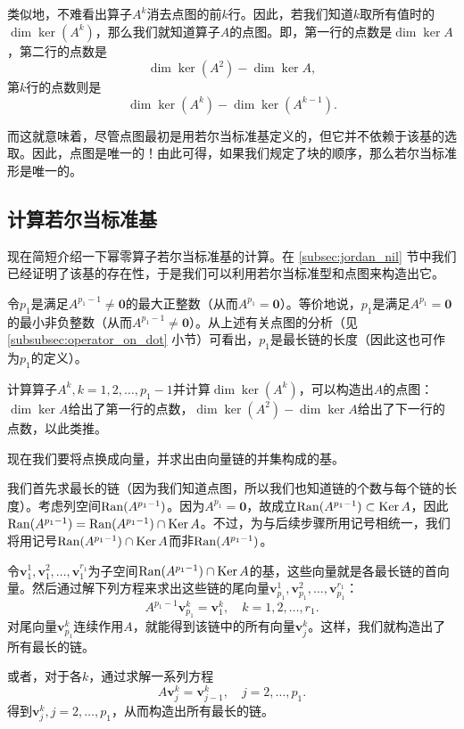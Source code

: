 类似地，不难看出算子$A^k$消去点图的前$k$行。因此，若我们知道$k$取所有值时的$\dim\ker(A^k)$，那么我们就知道算子$A$的点图。即，第一行的点数是$\dim \ker A$，第二行的点数是\[\dim \ker(A^2)-\dim \ker A,\]第$k$行的点数则是\[\dim \ker(A^k)-\dim \ker (A^{k-1}).\]

而这就意味着，尽管点图最初是用若尔当标准基定义的，但它并不依赖于该基的选取。因此，点图是唯一的！由此可得，如果我们规定了块的顺序，那么若尔当标准形是唯一的。

\subsection{计算若尔当标准基}\label{subsec:compute_jordan}

现在简短介绍一下幂零算子若尔当标准基的计算。在 \ref{subsec:jordan_nil} 节中我们已经证明了该基的存在性，于是我们可以利用若尔当标准型和点图来构造出它。

令$p_1$是满足$A^{p_1-1}\ne\mathbf{0}$的最大正整数（从而$A^{p_1}=\mathbf{0}$）。等价地说，$p_1$是满足$A^{p_1}=\mathbf{0}$的最小非负整数（从而$A^{p_1-1}\ne\mathbf{0}$）。从上述有关点图的分析（见 \ref{subsubsec:operator_on_dot} 小节）可看出，$p_1$是最长链的长度（因此这也可作为$p_1$的定义）。

计算算子$A^k,k=1,2,\dots,p_1-1$并计算$\dim\ker (A^k)$，可以构造出$A$的点图：$\dim\ker A$给出了第一行的点数，$\dim \ker(A^2)-\dim \ker A$给出了下一行的点数，以此类推。

现在我们要将点换成向量，并求出由向量链的并集构成的基。

我们首先求最长的链（因为我们知道点图，所以我们也知道链的个数与每个链的长度）。考虑列空间$\operatorname{Ran} (A^{p_1-1})$。因为$A^{p_1}=\mathbf{0}$，故成立$\operatorname{Ran}(A^{p_1-1})\subset \operatorname{Ker} A$，因此$\operatorname{Ran}(A^{p_1-1}) = \operatorname{Ran}(A^{p_1-1})\cap \operatorname{Ker} A$。不过，为与后续步骤所用记号相统一，我们将用记号$\operatorname{Ran}(A^{p_1-1})\cap \operatorname{Ker} A$而非$\operatorname{Ran}(A^{p_1-1})$。

令$\mathbf{v}_1^1,\mathbf{v}_1^2,\ldots,\mathbf{v}_1^{r_1}$为子空间$\operatorname{Ran}(A^{p_1-1})\cap \operatorname{Ker} A$的基，这些向量就是各最长链的首向量。然后通过解下列方程来求出这些链的尾向量$\mathbf{v}_{p_{1}}^{1},\mathbf{v}_{p_{1}}^{2},\ldots,\mathbf{v}_{p_{1}}^{r_{1}}$：
\[A^{p_1-1}\mathbf{v}_{p_1}^k=\mathbf{v}_1^k,\quad k=1,2,\ldots,r_1.\]
对尾向量$\mathbf{v}_{p_1}^k$连续作用$A$，就能得到该链中的所有向量$\mathbf{v}_{j}^k$。这样，我们就构造出了所有最长的链。

或者，对于各$k$，通过求解一系列方程\[A\mathbf{v}_j^k = \mathbf{v}_{j-1}^k,\quad j=2,\dots,p_1.\]
得到$\mathbf{v}_j^k, j=2,\dots,p_1$，从而构造出所有最长的链。

